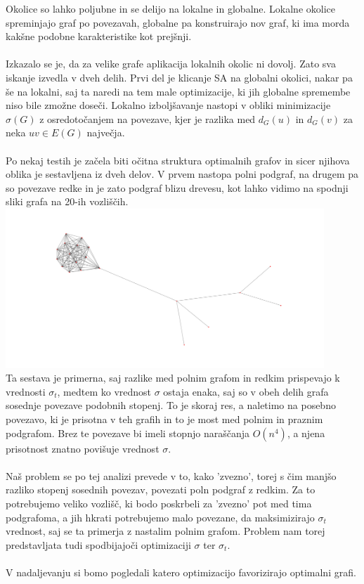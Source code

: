 \documentclass[ letterpaper, titlepage, fleqn]{article}
\begin{document}
Okolice so lahko poljubne in se delijo na lokalne in globalne.
Lokalne okolice spreminjajo graf po povezavah, globalne pa
konstruirajo nov graf, ki ima morda kakšne podobne karakteristike kot prejšnji.
\\\\
Izkazalo se je, da za velike grafe aplikacija lokalnih okolic ni dovolj. Zato
sva iskanje izvedla v dveh delih. Prvi del je klicanje SA na globalni okolici, nakar
pa še na lokalni, saj ta naredi na tem male optimizacije, ki jih globalne spremembe 
niso bile zmožne doseči.
Lokalno izboljšavanje nastopi v obliki minimizacije $\sigma(G)$ z osredotočanjem na
povezave, kjer je razlika med $d_G(u)$ in $d_G(v)$ za neka $uv \in E(G)$ največja.
\\\\
Po nekaj testih je začela biti očitna struktura optimalnih grafov in sicer
njihova oblika je sestavljena iz dveh delov. V prvem nastopa polni podgraf, 
na drugem pa so povezave redke in je zato podgraf blizu drevesu, kot lahko 
vidimo na spodnji sliki grafa na 20-ih vozliščih. \\
\includegraphics[width=\textwidth, height=6cm]{graphics/sample.png} \\
Ta sestava je primerna, saj razlike med polnim grafom in redkim prispevajo 
k vrednosti $\sigma_t$, medtem ko vrednost $\sigma$ ostaja enaka, saj so v obeh
delih grafa sosednje povezave podobnih stopenj. To je skoraj res, a naletimo na posebno povezavo,
ki je prisotna v teh grafih in to je most med polnim in praznim podgrafom. Brez te povezave
bi imeli stopnjo naraščanja $O(n^4)$, a njena prisotnost znatno povišuje vrednost $\sigma$.
\\\\
Naš problem se po tej analizi prevede v to, kako 'zvezno', torej s čim manjšo razliko stopenj sosednih povezav, 
povezati poln podgraf z redkim. 
Za to potrebujemo veliko vozlišč, ki bodo poskrbeli za 'zvezno' pot med tima podgrafoma,  
a jih hkrati potrebujemo malo povezane, da maksimizirajo $\sigma_t$ vrednost, saj se ta primerja
z nastalim polnim grafom. Problem nam torej predstavljata tudi spodbijajoči optimizaciji $\sigma$ ter $\sigma_t$.
\\\\
V nadaljevanju si bomo pogledali katero optimizacijo favorizirajo optimalni grafi.
\end{document}
